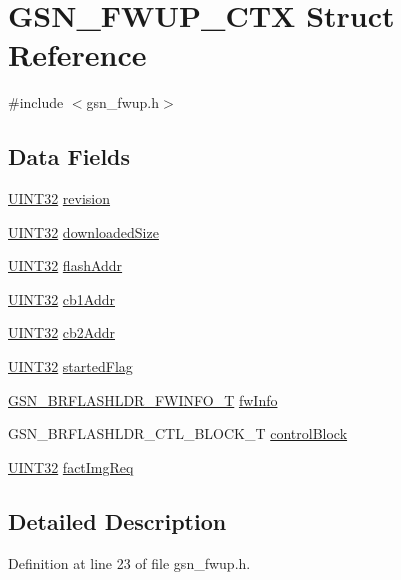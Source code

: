 \hypertarget{a00082}{
\section{GSN\_\-FWUP\_\-CTX Struct Reference}
\label{a00082}
}


{\ttfamily \#include $<$gsn\_\-fwup.h$>$}

\subsection*{Data Fields}
\begin{DoxyCompactItemize}
\item 
\hyperlink{a00660_gae1e6edbbc26d6fbc71a90190d0266018}{UINT32} \hyperlink{a00082_adb927f9d46b9a2bb19fbe22051bb7bfc}{revision}
\item 
\hyperlink{a00660_gae1e6edbbc26d6fbc71a90190d0266018}{UINT32} \hyperlink{a00082_ab82e937482257876d6356427b796113d}{downloadedSize}
\item 
\hyperlink{a00660_gae1e6edbbc26d6fbc71a90190d0266018}{UINT32} \hyperlink{a00082_af3fae94809cef9bd6c5e106b985a95d3}{flashAddr}
\item 
\hyperlink{a00660_gae1e6edbbc26d6fbc71a90190d0266018}{UINT32} \hyperlink{a00082_a2c070b4c213bd0188ec289a902bd6b73}{cb1Addr}
\item 
\hyperlink{a00660_gae1e6edbbc26d6fbc71a90190d0266018}{UINT32} \hyperlink{a00082_a11b562d4667b6205be4e6bd3abba3066}{cb2Addr}
\item 
\hyperlink{a00660_gae1e6edbbc26d6fbc71a90190d0266018}{UINT32} \hyperlink{a00082_aabd9d04d5a2eea283732ed35b01fa6b0}{startedFlag}
\item 
\hyperlink{a00028}{GSN\_\-BRFLASHLDR\_\-FWINFO\_\-T} \hyperlink{a00082_a4962d370920459d556cb3c7ca1399475}{fwInfo}
\item 
GSN\_\-BRFLASHLDR\_\-CTL\_\-BLOCK\_\-T \hyperlink{a00082_a14389b4a9299ad6fda3aaddba908a5e6}{controlBlock}
\item 
\hyperlink{a00660_gae1e6edbbc26d6fbc71a90190d0266018}{UINT32} \hyperlink{a00082_a3f957f5cb73cf34d2f46335938ac9ba8}{factImgReq}
\end{DoxyCompactItemize}


\subsection{Detailed Description}


Definition at line 23 of file gsn\_\-fwup.h.



